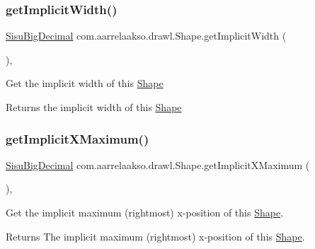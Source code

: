 \subsubsection{\texorpdfstring{get\+Implicit\+Width()}{getImplicitWidth()}}
{\footnotesize\ttfamily \hyperlink{classcom_1_1aarrelaakso_1_1drawl_1_1_sisu_big_decimal}{Sisu\+Big\+Decimal} com.\+aarrelaakso.\+drawl.\+Shape.\+get\+Implicit\+Width (\begin{DoxyParamCaption}{ }\end{DoxyParamCaption})\hspace{0.3cm}{\ttfamily [protected]}, {\ttfamily [inherited]}}

Get the implicit width of this \hyperlink{classcom_1_1aarrelaakso_1_1drawl_1_1_shape}{Shape}

\begin{DoxyReturn}{Returns}
the implicit width of this \hyperlink{classcom_1_1aarrelaakso_1_1drawl_1_1_shape}{Shape} 
\end{DoxyReturn}
\mbox{\label{classcom_1_1aarrelaakso_1_1drawl_1_1_shape_a3bde9d5b2cc582ddb6c521b122c40ff8}} 
\subsubsection{\texorpdfstring{get\+Implicit\+X\+Maximum()}{getImplicitXMaximum()}}
{\footnotesize\ttfamily \hyperlink{classcom_1_1aarrelaakso_1_1drawl_1_1_sisu_big_decimal}{Sisu\+Big\+Decimal} com.\+aarrelaakso.\+drawl.\+Shape.\+get\+Implicit\+X\+Maximum (\begin{DoxyParamCaption}{ }\end{DoxyParamCaption})\hspace{0.3cm}{\ttfamily [protected]}, {\ttfamily [inherited]}}

Get the implicit maximum (rightmost) x-\/position of this \hyperlink{classcom_1_1aarrelaakso_1_1drawl_1_1_shape}{Shape}.

\begin{DoxyReturn}{Returns}
The implicit maximum (rightmost) x-\/position of this \hyperlink{classcom_1_1aarrelaakso_1_1drawl_1_1_shape}{Shape}. 
\end{DoxyReturn}
\mbox{\label{classcom_1_1aarrelaakso_1_1drawl_1_1_shape_af0ceac29118047c73bd3ff308a71c36f}} 

